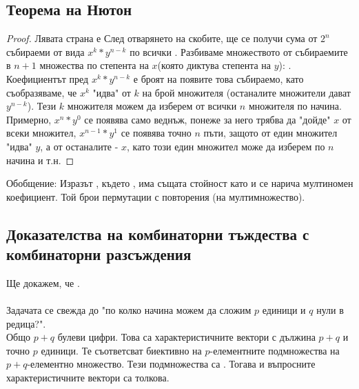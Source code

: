 \subsection*{Теорема на Нютон}
\begin{theorem}
\end{theorem}
\begin{proof}
    Лявата страна е 
    След отварянето на скобите, ще се получи сума от \(2^n\) събираеми от вида \(x^k * y^{n - k}\) по 
    всички . Разбиваме множеството от събираемите в \(n + 1\) множества по 
    степента на \(x\)(която диктува степента на \(y\)): . 
    Коефициентът пред \(x^k * y^{n - k}\) е броят на появите това събираемо, като съобразяваме, че
    \(x^k\) "идва" от \(k\) на брой множителя (останалите множители дават \(y^{n - k}\)). Тези \(k\) 
    множителя можем да изберем от всички \(n\) множителя по  начина.
    Примерно, \(x^n * y^0\) се появява само веднъж, понеже за него трябва да "дойде" \(x\) от всеки 
    множител, \(x^{n- 1} * y^1\) се появява точно \(n\) пъти, защото от един множител "идва" \(y\), а от 
    останалите - \(x\), като този един множител може да изберем по \(n\) начина и т.н.
\end{proof}

Обобщение:
Изразът , където , има същата стойност като 
 и се нарича 
мултиномен коефициент. Той брои пермутации с повторения (на мултимножество).

\subsection*{Доказателства на комбинаторни тъждества с комбинаторни разсъждения}
\begin{example}
    Ще докажем, че . \\
     \\
    Задачата се свежда до "по колко начина можем да сложим \(p\) единици и \(q\) нули в редица?". \\
    Общо \(p + q\) булеви цифри. Това са характеристичните вектори с дължина \(p + q\) и точно \(p\) единици.
    Те съответсват биективно на \(p\)-елементните подмножества на \(p + q\)-елементно множество. Тези 
    подмножества са . Тогава и въпросните характеристичните вектори са толкова.
\end{example}